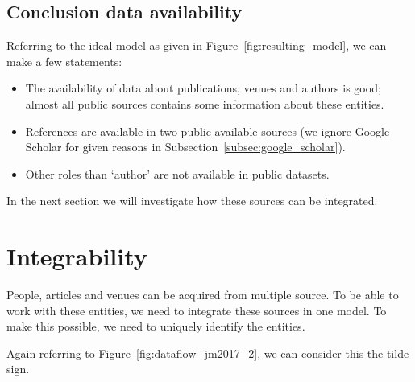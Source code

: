 \documentclass{ou-report}
\begin{document}
\subsection{Conclusion data availability}
\label{subsec:ConclusionsDataAvailablity}
Referring to the ideal model as given in Figure~\ref{fig:resulting_model}, we 
can make a few statements:
\begin{itemize}
    \item The availability of data about publications, venues and authors is 
    good; almost all public sources contains some information about these 
    entities. 
    \item References are available in two public available sources (we ignore 
    Google Scholar for given reasons in Subsection~\ref{subsec:google_scholar}).
    \item Other roles than `author' are not available in public datasets.
\end{itemize}

In the next section we will investigate how these sources can be integrated.



\section{Integrability}
People, articles and venues can be acquired from multiple source. To be able to 
work with these entities, we need to integrate these sources in one model. To 
make this possible, we need to uniquely identify the entities.

Again referring to Figure~\ref{fig:dataflow_jm2017_2}, we can consider this the 
tilde sign.
\end{document}
